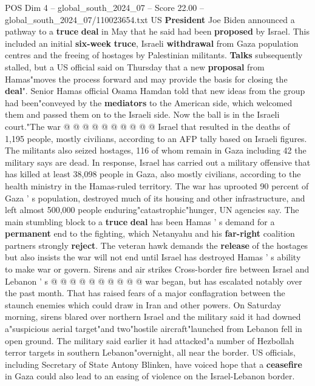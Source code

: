 \begin{textsample}{POS Dim 4 – global\_south\_2024\_07 – Score 22.00 – global\_south\_2024\_07/110023654.txt}
US \textbf{President} Joe Biden announced a pathway to a \textbf{truce} \textbf{deal} in May that he said had been \textbf{proposed} by Israel.
This included an initial \textbf{six-week} \textbf{truce}, Israeli \textbf{withdrawal} from Gaza population centres and the freeing of hostages by Palestinian militants. \textbf{Talks} subsequently stalled, but a US official said on Thursday that a new \textbf{proposal} from Hamas"moves the process forward and may provide the basis for closing the \textbf{deal}".
Senior Hamas official Osama Hamdan told that new ideas from the group had been"conveyed by the \textbf{mediators} to the American side, which welcomed them and passed them on to the Israeli side.
Now the ball is in the Israeli court."The war @ @ @ @ @ @ @ @ @ @ Israel that resulted in the deaths of 1,195 people, mostly civilians, according to an AFP tally based on Israeli figures.
The militants also seized hostages, 116 of whom remain in Gaza including 42 the military says are dead.
In response, Israel has carried out a military offensive that has killed at least 38,098 people in Gaza, also mostly civilians, according to the health ministry in the Hamas-ruled territory.
The war has uprooted 90 percent of Gaza ' s population, destroyed much of its housing and other infrastructure, and left almost 500,000 people enduring"catastrophic"hunger, UN agencies say.
The main stumbling block to a \textbf{truce} \textbf{deal} has been Hamas ' s demand for a \textbf{permanent} end to the fighting, which Netanyahu and his \textbf{far-right} coalition partners strongly \textbf{reject}.
The veteran hawk demands the \textbf{release} of the hostages but also insists the war will not end until Israel has destroyed Hamas ' s ability to make war or govern.
Sirens and air strikes Cross-border fire between Israel and Lebanon ' s @ @ @ @ @ @ @ @ @ @ war began, but has escalated notably over the past month.
That has raised fears of a major conflagration between the staunch enemies which could draw in Iran and other powers.
On Saturday morning, sirens blared over northern Israel and the military said it had downed a"suspicious aerial target"and two"hostile aircraft"launched from Lebanon fell in open ground.
The military said earlier it had attacked"a number of Hezbollah terror targets in southern Lebanon"overnight, all near the border.
US officials, including Secretary of State Antony Blinken, have voiced hope that a \textbf{ceasefire} in Gaza could also lead to an easing of violence on the Israel-Lebanon border.

\end{textsample}

